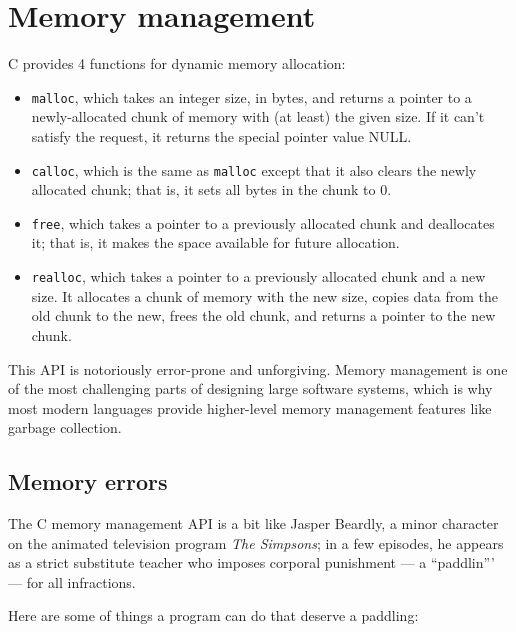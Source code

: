 \documentclass[12pt]{book}
\begin{document}
{%


\chapter{Memory management}

C provides 4 functions for dynamic memory allocation:

\begin{itemize}

\item {\tt malloc}, which takes an integer size, in bytes, and returns
a pointer to a newly-allocated chunk of memory with (at least) the
given size.  If it can't satisfy the request, it returns
the special pointer value NULL.

\item {\tt calloc}, which is the same as {\tt malloc} except that
it also clears the newly allocated chunk; that
is, it sets all bytes in the chunk to 0.

\item {\tt free}, which takes a pointer to a previously allocated
chunk and deallocates it; that is, it makes the space available for
future allocation.

\item {\tt realloc}, which takes a pointer to a previously allocated
chunk and a new size.  It allocates a chunk of memory with the new
size, copies data from the old chunk to the new, frees the old chunk,
and returns a pointer to the new chunk.

\end{itemize}

This API is notoriously error-prone and unforgiving.  Memory management
is one of the most challenging parts of designing large software systems,
which is why most modern languages provide higher-level memory
management features like garbage collection.


\section{Memory errors}

The C memory management API is a bit like Jasper Beardly, a minor
character on the animated television program {\it The Simpsons}; 
in a few episodes, he appears as a strict substitute teacher who imposes corporal punishment --- a ``paddlin''' --- for all infractions.

Here are some of things a program can do that deserve a paddling:

}
\end{document}
